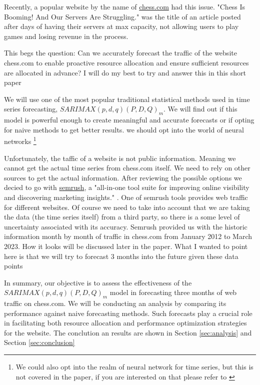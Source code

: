 \documentclass[journal]{IEEEtran}
\begin{document}
Recently, a popular website by the name of \href{https://chess.com}{chess.com}
had this issue.  "Chess Is Booming! And Our Servers Are Struggling."
\cite{chesscom} was the title of an article posted after days of having their
servers at max capacity, not allowing users to play games and losing revenue in
the process.

This begs the question: Can we accurately forecast the traffic of the website
chess.com to enable proactive resource allocation and ensure sufficient
resources are allocated in advance? I will do my best to try and answer this in
this short paper

We will use one of the most popular traditional statistical methods used in
time series forecasting, $SARIMAX(p,d,q)(P,D,Q)_m$. We will find out if this
model is powerful enough to create meaningful and accurate forecasts or if
opting for naive methods to get better results.  we should opt into the world
of neural networks \footnote{We could also opt into the realm of neural network
for time series, but this is not covered in the paper, if you are interested
on that please refer to \cite{nn}}

Unfortunately, the taffic of a website is not public information. Meaning we
cannot get the actual time series from chess.com itself. We need to rely on
other sources to get the actual information. After reviewing the possible
options we decied to go with  \href{http://semrush.com}{semrush}, a "all-in-one
tool suite for improving online visibility and discovering marketing insights."
\cite{semrush}. One of semrush tools provides web traffic for different
websites. Of course we need to take into account that we are taking the data
(the time series itself) from a third party, so there is a some level of
uncertainty associated with its accuracy. Semrush provided us with the historic
information month by month of traffic in chess.com from January 2012 to March
2023. How it looks will be discussed later in the paper. What I wanted to point
here is that we will try to forecast 3 months into the future given these data
points

In summary, our objective is to assess the effectiveness of the
$SARIMAX(p,d,q)(P,D,Q)_m$ model in forecasting three months of web traffic on
chess.com. We will be conducting an analysis by comparing its performance
against naive forecasting methods. Such forecasts play a crucial role in
facilitating both resource allocation and performance optimization strategies
for the website. The conclution an results are shown in Section
\ref{sec:analysis} and Section \ref{sec:conclusion}
\end{document}
